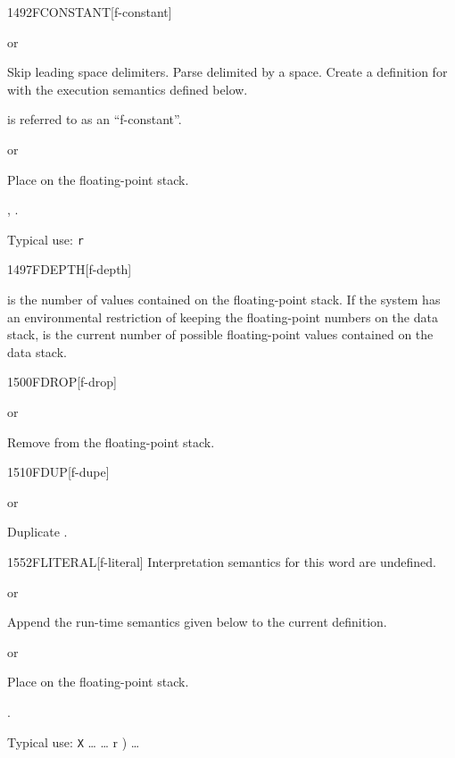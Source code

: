 \pagebreak
\begin{worddef}{1492}{FCONSTANT}[f-constant]
\item {}  or

	Skip leading space delimiters. Parse  delimited by a
	space. Create a definition for  with the execution
	semantics defined below.

	 is referred to as an ``f-constant''.

\execute[name]
	\stack{}{}  or

	Place  on the floating-point stack.

\see {},
	.

	\begin{rationale} %
		Typical use: \texttt{r}  
	\end{rationale}
\end{worddef}


\begin{worddef}{1497}{FDEPTH}[f-depth]
\item {}

	 is the number of values contained on the
	floating-point stack. If the system has an environmental
	restriction of keeping the floating-point numbers on the
	data stack,  is the current number of possible
	floating-point values contained on the data stack.
\end{worddef}


\begin{worddef}{1500}{FDROP}[f-drop]
\item {} or

	Remove  from the floating-point stack.
\end{worddef}


\begin{worddef}{1510}{FDUP}[f-dupe]
\item {} or

	Duplicate .
\end{worddef}


\begin{worddef}{1552}{FLITERAL}[f-literal]
\interpret
	Interpretation semantics for this word are undefined.

\compile
	 or

	Append the run-time semantics given below to the current
	definition.

\runtime
	 or

	Place  on the floating-point stack.

\see {}.

	\begin{rationale} %
		Typical use:
			\word[core]{:} \texttt{X} {\ldots}
				\word[core]{[} {\ldots}  r ) \word[core]{]}
				 {\ldots}
			\word[core]{;}
	\end{rationale}
\end{worddef}


